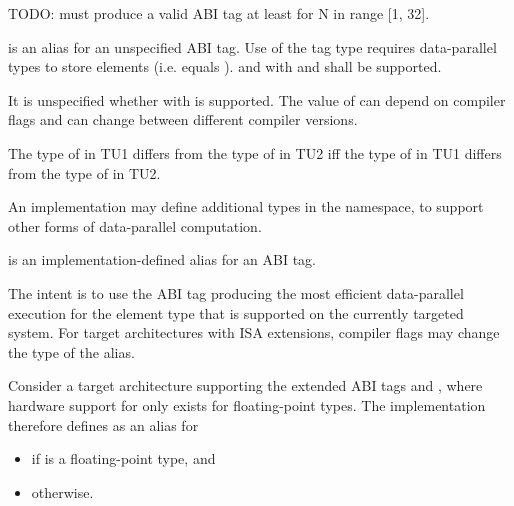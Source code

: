 \pnum
TODO:  must produce a valid ABI tag at least for N in range [1, 32].

\pnum
{} is an alias for an unspecified ABI tag.
Use of the  tag type requires data-parallel types to
store  elements (i.e.  equals
).
 and  with  and  shall be supported.

\pnum
\begin{note}It is unspecified whether  with  is supported. The value of  can depend on compiler flags and can change between different compiler versions.\end{note}

\pnum
  The type of  in TU1 differs from the type of
   in TU2 iff the type of  in TU1 differs from
  the type of  in TU2.

\pnum
An implementation may define additional  types in the  namespace, to support other forms of data-parallel computation.

\pnum
{} is an implementation-defined alias for an ABI tag. \begin{note}The intent is to use the ABI tag producing the most efficient data-parallel execution for the element type  that is supported on the currently targeted system. For target architectures with ISA extensions, compiler flags may change the type of the  alias.\end{note}
\begin{example}
  Consider a target architecture supporting the extended ABI tags  and , where hardware support for  only exists for floating-point types. The implementation therefore defines  as an alias for
  \begin{itemize}
    \item {} if  is a floating-point type, and
    \item {} otherwise.
  \end{itemize}
\end{example}

